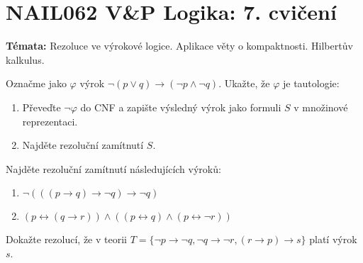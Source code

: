 \documentclass[a4paper,12pt]{article}
\begin{document}
\section*{NAIL062 V\&P Logika: 7. cvičení}




\textbf{Témata:}
Rezoluce ve výrokové logice. Aplikace věty o kompaktnosti. Hilbertův kalkulus.


\medskip\begin{problem}
    Označme jako $\varphi$ výrok $\neg (p \vee q) \to (\neg p \wedge \neg q)$. Ukažte, že $\varphi$ je tautologie:
    \begin{enumerate}
        \item Převeďte $\neg \varphi$ do CNF a zapište výsledný výrok jako formuli $S$ v množinové reprezentaci.
        \item Najděte rezoluční zamítnutí $S$.
    \end{enumerate}
    \end{problem}
    
    
    \medskip\begin{problem}
    Najděte rezoluční zamítnutí následujících výroků:
    \begin{enumerate}
        \item $\neg(((p\to q)\to \neg q)\to \neg q)$
        \item $(p\leftrightarrow (q\to r))\wedge((p\leftrightarrow q)\wedge(p\leftrightarrow \neg r))$
        
    \end{enumerate}
    \end{problem}
        
        
    \medskip\begin{problem}
    Dokažte rezolucí, že v teorii $T=\{\neg p \to \neg q,\neg q \to \neg r, (r\to p)\to s\}$ platí výrok $s$.
    \end{problem}
    
\end{document}
